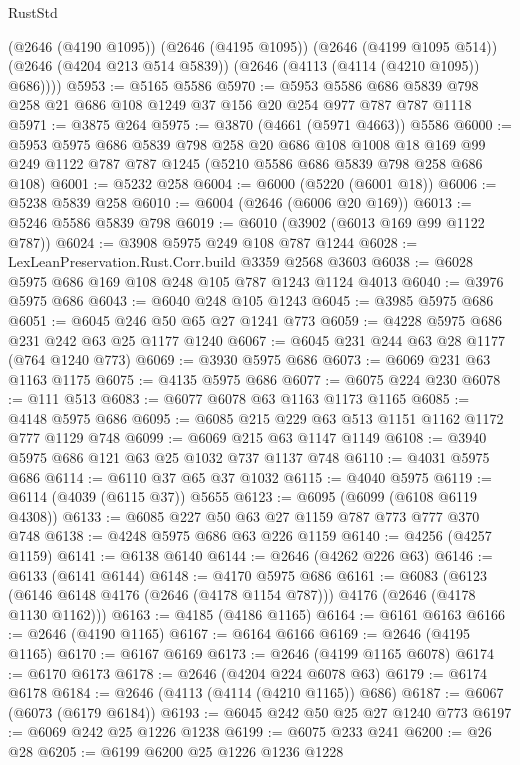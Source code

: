 \begin{lexlean}{RustStd}
\begin{coremodule}
        (@2646 (@4190 @1095))
        (@2646 (@4195 @1095))
        (@2646 (@4199 @1095 @514))
        (@2646 (@4204 @213 @514 @5839))
        (@2646 (@4113 (@4114 (@4210 @1095)) @686))))
@5953 := @5165 @5586
@5970 := @5953 @5586 @686 @5839 @798 @258 @21 @686 @108 @1249 @37 @156 @20 @254 @977 @787 @787 @1118
@5971 := @3875 @264
@5975 := @3870 (@4661 (@5971 @4663)) @5586
@6000 := @5953
    @5975
    @686
    @5839
    @798
    @258
    @20
    @686
    @108
    @1008
    @18
    @169
    @99
    @249
    @1122
    @787
    @787
    @1245
    (@5210 @5586 @686 @5839 @798 @258 @686 @108)
@6001 := @5232 @258
@6004 := @6000 (@5220 (@6001 @18))
@6006 := @5238 @5839 @258
@6010 := @6004 (@2646 (@6006 @20 @169))
@6013 := @5246 @5586 @5839 @798
@6019 := @6010 (@3902 (@6013 @169 @99 @1122 @787))
@6024 := @3908 @5975 @249 @108 @787 @1244
@6028 := LexLeanPreservation.Rust.Corr.build @3359 @2568 @3603
@6038 := @6028 @5975 @686 @169 @108 @248 @105 @787 @1243 @1124 @4013
@6040 := @3976 @5975 @686
@6043 := @6040 @248 @105 @1243
@6045 := @3985 @5975 @686
@6051 := @6045 @246 @50 @65 @27 @1241 @773
@6059 := @4228 @5975 @686 @231 @242 @63 @25 @1177 @1240
@6067 := @6045 @231 @244 @63 @28 @1177 (@764 @1240 @773)
@6069 := @3930 @5975 @686
@6073 := @6069 @231 @63 @1163 @1175
@6075 := @4135 @5975 @686
@6077 := @6075 @224 @230
@6078 := @111 @513
@6083 := @6077 @6078 @63 @1163 @1173 @1165
@6085 := @4148 @5975 @686
@6095 := @6085 @215 @229 @63 @513 @1151 @1162 @1172 @777 @1129 @748
@6099 := @6069 @215 @63 @1147 @1149
@6108 := @3940 @5975 @686 @121 @63 @25 @1032 @737 @1137 @748
@6110 := @4031 @5975 @686
@6114 := @6110 @37 @65 @37 @1032
@6115 := @4040 @5975
@6119 := @6114 (@4039 (@6115 @37)) @5655
@6123 := @6095 (@6099 (@6108 @6119 @4308))
@6133 := @6085 @227 @50 @63 @27 @1159 @787 @773 @777 @370 @748
@6138 := @4248 @5975 @686 @63 @226 @1159
@6140 := @4256 (@4257 @1159)
@6141 := @6138 @6140
@6144 := @2646 (@4262 @226 @63)
@6146 := @6133 (@6141 @6144)
@6148 := @4170 @5975 @686
@6161 := @6083
    (@6123 (@6146 @6148 @4176 (@2646 (@4178 @1154 @787))) @4176 (@2646 (@4178 @1130 @1162)))
@6163 := @4185 (@4186 @1165)
@6164 := @6161 @6163
@6166 := @2646 (@4190 @1165)
@6167 := @6164 @6166
@6169 := @2646 (@4195 @1165)
@6170 := @6167 @6169
@6173 := @2646 (@4199 @1165 @6078)
@6174 := @6170 @6173
@6178 := @2646 (@4204 @224 @6078 @63)
@6179 := @6174 @6178
@6184 := @2646 (@4113 (@4114 (@4210 @1165)) @686)
@6187 := @6067 (@6073 (@6179 @6184))
@6193 := @6045 @242 @50 @25 @27 @1240 @773
@6197 := @6069 @242 @25 @1226 @1238
@6199 := @6075 @233 @241
@6200 := @26 @28
@6205 := @6199 @6200 @25 @1226 @1236 @1228

\end{coremodule}
\end{lexlean}
